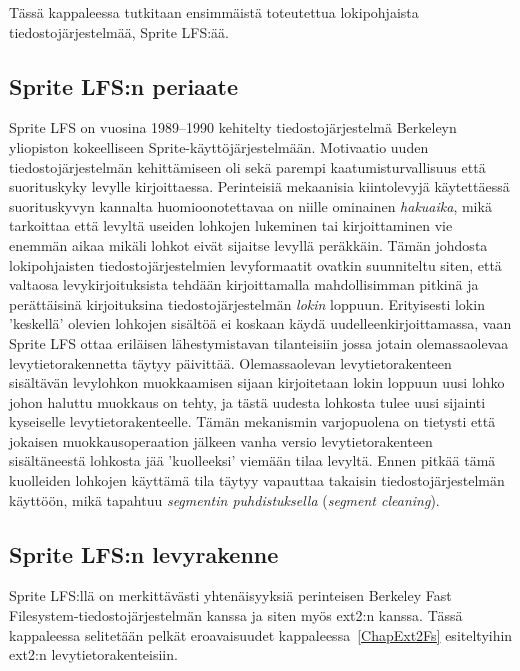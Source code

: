 Tässä kappaleessa tutkitaan ensimmäistä toteutettua lokipohjaista tiedostojärjestelmää, Sprite LFS:ää.

\subsection{Sprite LFS:n periaate}
Sprite LFS on vuosina 1989--1990 kehitelty tiedostojärjestelmä Berkeleyn yliopiston kokeelliseen Sprite-käyttöjärjestelmään.
Motivaatio uuden tiedostojärjestelmän kehittämiseen oli sekä parempi kaatumisturvallisuus että suorituskyky levylle kirjoittaessa.
Perinteisiä mekaanisia kiintolevyjä käytettäessä suorituskyvyn kannalta huomioonotettavaa on niille ominainen \emph{hakuaika},
mikä tarkoittaa että levyltä useiden lohkojen lukeminen tai kirjoittaminen vie enemmän aikaa mikäli lohkot eivät sijaitse levyllä peräkkäin.
Tämän johdosta lokipohjaisten tiedostojärjestelmien levyformaatit ovatkin suunniteltu siten,
että valtaosa levykirjoituksista tehdään kirjoittamalla mahdollisimman pitkinä ja perättäisinä kirjoituksina tiedostojärjestelmän \emph{lokin} loppuun.
Erityisesti lokin 'keskellä' olevien lohkojen sisältöä ei koskaan käydä uudelleenkirjoittamassa,
vaan Sprite LFS ottaa eriläisen lähestymistavan tilanteisiin jossa jotain olemassaolevaa levytietorakennetta täytyy päivittää.
Olemassaolevan levytietorakenteen sisältävän levylohkon muokkaamisen sijaan kirjoitetaan lokin loppuun uusi lohko johon haluttu muokkaus on tehty,
ja tästä uudesta lohkosta tulee uusi sijainti kyseiselle levytietorakenteelle.
Tämän mekanismin varjopuolena on tietysti että jokaisen muokkausoperaation jälkeen vanha versio levytietorakenteen sisältäneestä lohkosta jää 'kuolleeksi' viemään tilaa levyltä.
Ennen pitkää tämä kuolleiden lohkojen käyttämä tila täytyy vapauttaa takaisin tiedostojärjestelmän käyttöön,
mikä tapahtuu \emph{segmentin puhdistuksella} (\emph{segment cleaning}).

\subsection{Sprite LFS:n levyrakenne}

Sprite LFS:llä on merkittävästi yhtenäisyyksiä perinteisen Berkeley Fast Filesystem-tiedostojärjestelmän kanssa ja siten myös ext2:n kanssa.
Tässä kappaleessa selitetään pelkät eroavaisuudet kappaleessa~\ref{ChapExt2Fs} esiteltyihin ext2:n levytietorakenteisiin.

